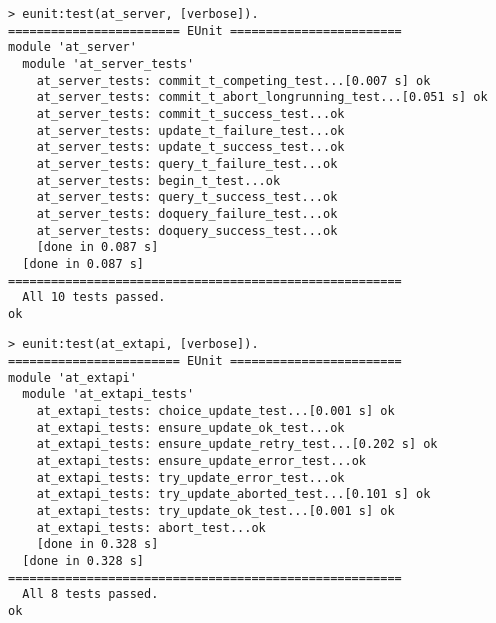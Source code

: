 \documentclass[
paper=a4,
oneside,
fontsize=11pt,
numbers=noenddot,
headinclude=false, %
footinclude=false, %
fleqn,             %
DIV=8
]{scrartcl}
\begin{document}
\begin{lstlisting}[caption=Session output: {\tt src/at\_server/at\_server\_tests.erl}, label=lst:testoutserver]
> eunit:test(at_server, [verbose]).
======================== EUnit ========================
module 'at_server'
  module 'at_server_tests'
    at_server_tests: commit_t_competing_test...[0.007 s] ok
    at_server_tests: commit_t_abort_longrunning_test...[0.051 s] ok
    at_server_tests: commit_t_success_test...ok
    at_server_tests: update_t_failure_test...ok
    at_server_tests: update_t_success_test...ok
    at_server_tests: query_t_failure_test...ok
    at_server_tests: begin_t_test...ok
    at_server_tests: query_t_success_test...ok
    at_server_tests: doquery_failure_test...ok
    at_server_tests: doquery_success_test...ok
    [done in 0.087 s]
  [done in 0.087 s]
=======================================================
  All 10 tests passed.
ok
\end{lstlisting}

\begin{lstlisting}[caption=Session output: {\tt src/at\_server/at\_extapi\_tests.erl}, label=lst:testoutextapi]
> eunit:test(at_extapi, [verbose]).
======================== EUnit ========================
module 'at_extapi'
  module 'at_extapi_tests'
    at_extapi_tests: choice_update_test...[0.001 s] ok
    at_extapi_tests: ensure_update_ok_test...ok
    at_extapi_tests: ensure_update_retry_test...[0.202 s] ok
    at_extapi_tests: ensure_update_error_test...ok
    at_extapi_tests: try_update_error_test...ok
    at_extapi_tests: try_update_aborted_test...[0.101 s] ok
    at_extapi_tests: try_update_ok_test...[0.001 s] ok
    at_extapi_tests: abort_test...ok
    [done in 0.328 s]
  [done in 0.328 s]
=======================================================
  All 8 tests passed.
ok
\end{lstlisting}
\end{document}
